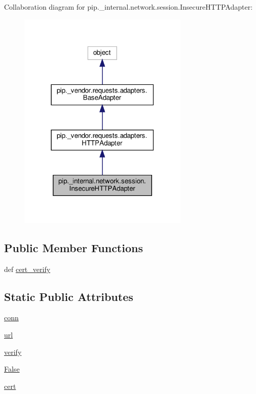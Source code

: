 Collaboration diagram for pip.\+\_\+internal.\+network.\+session.\+Insecure\+H\+T\+T\+P\+Adapter\+:
\nopagebreak
\begin{figure}[H]
\begin{center}
\leavevmode
\includegraphics[width=231pt]{classpip_1_1__internal_1_1network_1_1session_1_1InsecureHTTPAdapter__coll__graph}
\end{center}
\end{figure}
\subsection*{Public Member Functions}
\begin{DoxyCompactItemize}
\item 
def \hyperlink{classpip_1_1__internal_1_1network_1_1session_1_1InsecureHTTPAdapter_a74e8815e89b697cdffd6b00d9cda606d}{cert\+\_\+verify}
\end{DoxyCompactItemize}
\subsection*{Static Public Attributes}
\begin{DoxyCompactItemize}
\item 
\hyperlink{classpip_1_1__internal_1_1network_1_1session_1_1InsecureHTTPAdapter_afb54c7a0b5f2421ee220b6dfc4266eae}{conn}
\item 
\hyperlink{classpip_1_1__internal_1_1network_1_1session_1_1InsecureHTTPAdapter_a3fd2d60714db959f729b3ea082c1cde2}{url}
\item 
\hyperlink{classpip_1_1__internal_1_1network_1_1session_1_1InsecureHTTPAdapter_adc7ca9c0134956bc39cc0cd241959874}{verify}
\item 
\hyperlink{classpip_1_1__internal_1_1network_1_1session_1_1InsecureHTTPAdapter_a1e115d45febd809a35086634f58d04bd}{False}
\item 
\hyperlink{classpip_1_1__internal_1_1network_1_1session_1_1InsecureHTTPAdapter_af4a3dbdc1753e5bcb485344ed3037b37}{cert}
\end{DoxyCompactItemize}

